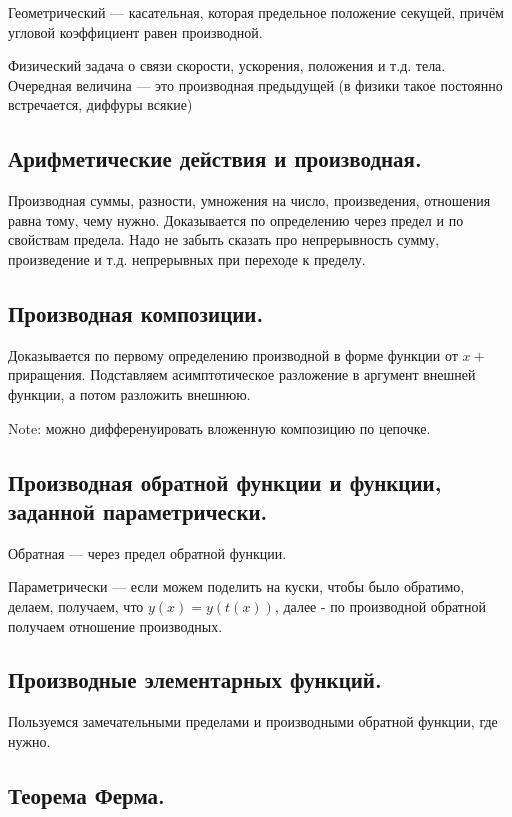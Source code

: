 \documentclass[12pt, a4paper]{article}
\begin{document}
Геометрический — касательная, которая предельное положение секущей, причём угловой коэффициент равен производной.

Физический задача о связи скорости, ускорения, положения и т.д. тела. 
Очередная величина — это производная предыдущей (в физики такое постоянно встречается, диффуры всякие)

\subsection{Арифметические действия и производная.}

Производная суммы, разности, умножения на число, произведения, отношения равна тому, чему нужно.
Доказывается по определению через предел и по свойствам предела. 
Надо не забыть сказать про непрерывность сумму, произведение и т.д. непрерывных при переходе к пределу.

\subsection{Производная композиции.}

Доказывается по первому определению производной в форме функции от $x +$ приращения.
Подставляем асимптотическое разложение в аргумент внешней функции, а потом разложить внешнюю.

Note: можно дифференуировать вложенную композицию по цепочке.

\subsection{Производная обратной функции и функции, заданной параметрически.}

Обратная — через предел обратной функции.

Параметрически — если можем поделить на куски, чтобы было обратимо, делаем, получаем, что
$y(x) = y(t(x))$, далее - по производной обратной получаем отношение производных.

\subsection{Производные элементарных функций.}

Пользуемся замечательными пределами и производными обратной функции, где нужно.

\subsection{Теорема Ферма.}
\end{document}
